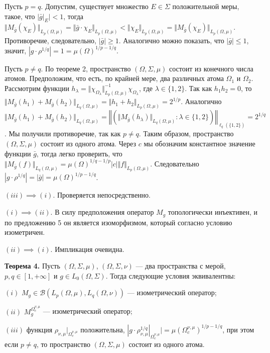 \documentclass[11pt,twoside]{article}
\begin{document}
Пусть $p=q$. Допустим, существует множество $E\in\Sigma$ положительной
меры, такое, что $|\bar{g}|_E|<1$, тогда $\Vert
M_{\bar{g}}(\chi_E)\Vert_{L_p(\Omega,\mu)} =\Vert
\bar{g}\cdot\chi_E\Vert_{L_p(\Omega,\mu)}
<\Vert\chi_E\Vert_{L_p(\Omega,\mu)} =\Vert
M_{\bar{g}}(\chi_E)\Vert_{L_p(\Omega,\mu)}$. Противоречие,
следовательно, $|\bar{g}|\geq 1$. Аналогично можно показать, что
$|\bar{g}|\leq 1$, значит,
$|g\cdot\rho^{1/q}|=1={\mu(\Omega)}^{1/p-1/q}$.

Пусть $p\neq q$. По теореме 2, пространство $(\Omega,\Sigma,\mu)$
состоит из конечного числа атомов. Предположим, что есть, по крайней
мере, два различных атома $\Omega_1$ и $\Omega_2$. Рассмотрим функции
$h_\lambda
=\Vert\chi_{\Omega_\lambda}\Vert_{L_p(\Omega,\mu)}^{-1}
\chi_{\Omega_\lambda}$,
где $\lambda\in \{1,2 \}$. Так как $h_1h_2=0$, то $ \Vert
M_{\bar{g}}(h_1)+M_{\bar{g}}(h_2)\Vert_{L_q(\Omega,\mu)} =\Vert
h_1+h_2\Vert_{L_p(\Omega,\mu)} =2^{1/p}$. Аналогично $ \Vert
M_{\bar{g}}(h_1)+M_{\bar{g}}(h_2)\Vert_{L_q(\Omega,\mu)}
=\left\Vert\left(\Vert
M_{\bar{g}}(h_\lambda)\Vert_{L_q(\Omega,\mu)}:\lambda\in \{1,2 \}\right)
\right\Vert_{\ell_q(\{1,2\})} =2^{1/q}$. Мы получили противоречие, так
как $p\neq q$. Таким образом, пространство $(\Omega,\Sigma,\mu)$ состоит
из одного атома. Через $c$ мы обозначим константное значение функции
$\bar{g}$, тогда легко проверить, что $\Vert
M_{\bar{g}}(f)\Vert_{L_q(\Omega,\mu)}={\mu(\Omega)}^{1/q-1/p}|c|\Vert
f\Vert_{L_p(\Omega,\mu)}$. Следовательно
$|g\cdot\rho^{1/q}|=|\bar{g}|={\mu(\Omega)}^{1/p-1/q}$.

$(iii)$$\implies$$ (i)$. Проверяется непосредственно.

$(i)$$\implies$$ (ii)$. В силу предположения оператор $M_g$ топологически
инъективен, и по предложению 5 он является изоморфизмом, который
согласно условию изометричен.

$(ii)$$\implies$$ (i)$. Импликация очевидна.


\textbf{Теорема 4.} Пусть $(\Omega,\Sigma,\mu)$, $(\Omega,\Sigma,\nu)$
--- два пространства с мерой, $p,q\in[1,+\infty]$ и $g\in
L_0(\Omega,\Sigma)$. Тогда следующие условия эквивалентны:

$(i)$ $M_g\in\mathcal{B}(L_p(\Omega,\mu),L_q(\Omega,\nu))$ ---
изометрический оператор;

$(ii)$ $M_g^{\Omega_c^{\nu,\mu}}$ --- изометрический оператор;

$(iii)$ функция $\rho_{\nu,\mu}|_{\Omega_c^{\nu,\mu}}$ положительна,
$|g\cdot
\rho_{\nu,\mu}^{1/q}|_{\Omega_c^{\nu,\mu}}|
={\mu(\Omega_c^{\nu,\mu})}^{1/p-1/q}$,
при этом если $p\neq q$, то пространство $(\Omega,\Sigma,\mu)$ состоит из
одного атома.
\end{document}
